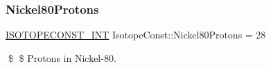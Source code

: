 \subsubsection{\texorpdfstring{Nickel80\+Protons}{Nickel80Protons}}
{\footnotesize\ttfamily \mbox{\hyperlink{group___isotope_const-_macros_ga5f18360b3e99483a35c32d789e62621c}{I\+S\+O\+T\+O\+P\+E\+C\+O\+N\+S\+T\+\_\+\+I\+NT}} Isotope\+Const\+::\+Nickel80\+Protons = 28}

\$ \$ Protons in Nickel-\/80. 